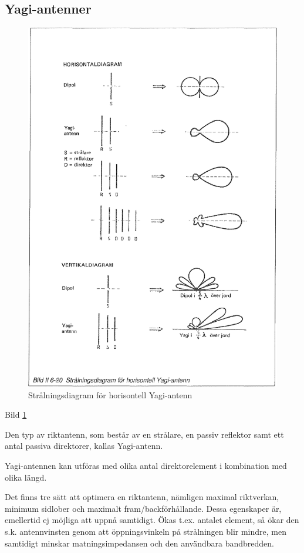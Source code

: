 \subsection{Yagi-antenner}

\begin{figure}
  \includegraphics[width=\textwidth]{images/bild_2_6-20}
  \caption{Strålningsdiagram för horisontell Yagi-antenn}
  \label{fig:bildII6-20}
\end{figure}

Bild \ref{fig:bildII6-20}

Den typ av riktantenn, som består av en strålare, en passiv reflektor
samt ett antal passiva direktorer, kallas Yagi-antenn.

Yagi-antennen kan utföras med olika antal direktorelement i
kombination med olika längd.

Det finns tre sätt att optimera en riktantenn, nämligen maximal
riktverkan, minimum sidlober och maximalt fram/backförhållande. Dessa
egenskaper är, emellertid ej möjliga att uppnå samtidigt. Ökas t.ex.
antalet element, så ökar den s.k. antennvinsten genom att
öppningsvinkeln på strålningen blir mindre, men samtidigt minskar
matningsimpedansen och den användbara bandbredden.

